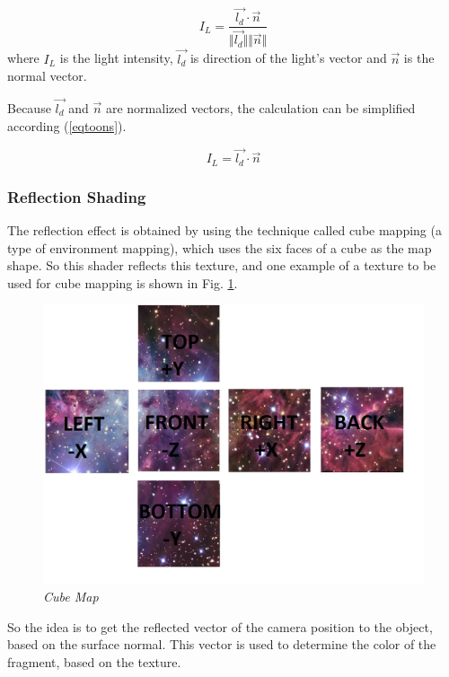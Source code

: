 \documentclass[10pt, conference, compsocconf]{IEEEtran}
\begin{document}
{	\begin{equation}
		I_ {L} = \frac{ \vec{l_{d}} \cdot \vec{n} } {\Vert \vec{l_{d}} \Vert  \Vert \vec{n} \Vert } 
	\label{eqtoon}
	\end{equation}
	where $ I_L $ is the light intensity, $\vec{l_ {d}} $ is direction of the light's vector and $\vec {n} $ is the normal vector.

Because $\vec{l_{d}}$ and $\vec{n}$  are normalized vectors, the calculation can be simplified according (\ref{eqtoons}).

	\begin{equation}
		I_ {L} =  \vec{l_{d}} \cdot \vec{n}  
	\label{eqtoons}
	\end{equation}

\subsubsection{Reflection Shading}
\label{reflection}

The reflection effect is obtained by using the technique called cube mapping (a type of environment mapping), which uses the six faces of a cube as the map shape. 
So this shader reflects this texture, and one example of a texture to be used for cube mapping is shown in Fig. \ref{environment}.

	\begin{figure}[ht]
	\centering
		\includegraphics[keepaspectratio=true,scale=0.3]{envmap.jpg}
	\caption{\textit{Cube Map}}
	\label{environment}
	\end{figure}

So the idea is to get the reflected vector of the camera position to the object, based on the surface normal. 
This vector is used to determine the color of the fragment, based on the texture.

}
\end{document}

